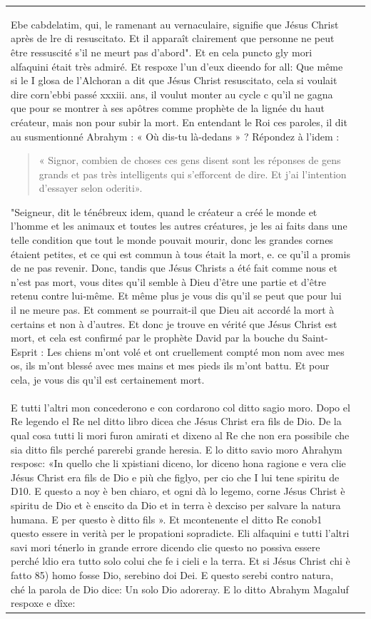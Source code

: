 \begin{longtable}{p{}p{}}
Ebe cabdelatim, qui, le ramenant au vernaculaire, signifie que Jésus Christ après de lre di resuscitato. Et il apparaît clairement que personne ne peut être ressuscité s'il ne meurt pas d'abord". Et en cela
puncto gly mori alfaquini était très admiré. Et respoxe l'un d'eux dieendo for all: Que même si le I glosa de l'Alchoran a dit que Jésus Christ resuscitato, cela si voulait dire corn'ebbi
passé xxxiii. ans, il voulut monter au cycle c qu'il ne gagna que pour se montrer à ses apôtres comme prophète de la lignée du haut créateur, mais non pour subir la mort. En entendant le Roi ces paroles, il dit au susmentionné Abrahym : « Où dis-tu là-dedans » ? Répondez à l'idem : \begin{quote}
    « Signor, combien de choses ces gens disent sont les réponses de gens grands et pas très intelligents qui s'efforcent de dire. Et j'ai l'intention d'essayer selon oderiti».
\end{quote} "Seigneur, dit le ténébreux idem, quand le créateur a créé le monde et l'homme et les animaux et toutes les autres créatures, je les ai faits dans une telle condition que tout le monde pouvait mourir, donc les grandes cornes étaient petites, et ce qui est commun à tous était la mort, e. ce qu'il a promis de ne pas revenir. Donc, tandis que Jésus Christs a été fait comme nous et n'est pas mort, vous dites qu'il semble à Dieu d'être une partie et d'être retenu contre lui-même. Et même plus je vous dis qu'il se peut que pour lui il ne meure pas. Et comment se pourrait-il que Dieu ait accordé la mort à certains et non à d'autres. Et donc je trouve en vérité que Jésus Christ est mort, et cela est confirmé par le prophète David par la bouche du Saint-Esprit : Les chiens m'ont volé et ont cruellement compté mon nom avec mes os, ils m'ont blessé avec mes mains et mes pieds ils m'ont battu. Et pour cela, je vous dis qu'il est certainement mort. \\
E tutti l'altri mon concederono e con  cordarono col ditto sagio moro. Dopo el Re legendo el Re nel ditto libro dicea che Jésus Christ era fils de Dio. De la qual cosa tutti li mori furon amirati et dixeno al Re che non era possibile che sia ditto fils perché parerebi grande heresia. E lo ditto savio moro Ahrahym resposc: «In quello che li xpistiani diceno, lor diceno hona ragione e vera clie Jésus Christ
era fils de Dio e più che figlyo, per cio che I lui tene spiritu
de D10. E questo a noy è ben chiaro, et ogni dà lo legemo, corne Jésus Christ è spiritu de Dio et è enscito da Dio et in terra è dexciso per salvare la natura humana. E per questo è ditto fils ». Et mcontenente el ditto Re conob1 questo essere in verità per le propationi sopradicte.
Eli alfaquini e tutti l'altri savi mori ténerlo in grande errore dicendo clie questo no possiva essere perché ldio era tutto solo colui che fe  i cieli e la terra. Et si Jésus Christ chi è fatto
85) homo fosse Dio, serebino doi Dei. E questo serebi contro natura, ché la parola de Dio dice: Un solo Dio adoreray. E lo ditto Abrahym Magaluf respoxe e dîxe: 


\end{longtable}
